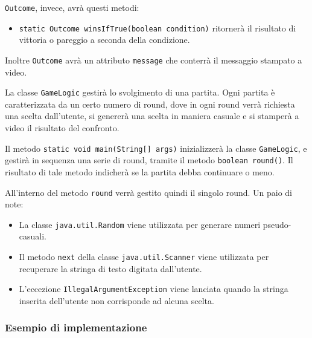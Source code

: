 \documentclass{article}
\begin{document}
\texttt{Outcome}, invece, avrà questi metodi:

\begin{itemize}
	\item \texttt{static Outcome winsIfTrue(boolean condition)} ritornerà il risultato di vittoria o pareggio a seconda della condizione.
\end{itemize}
Inoltre \texttt{Outcome} avrà un attributo \texttt{message} che conterrà il messaggio stampato a video.

La classe \texttt{GameLogic} gestirà lo svolgimento di una partita.
Ogni partita è caratterizzata da un certo numero di round, 
dove in ogni round verrà richiesta una scelta dall'utente, si genererà una scelta in maniera casuale
e si stamperà a video il risultato del confronto.

Il metodo \texttt{static void main(String[] args)} inizializzerà la classe \texttt{GameLogic},
e gestirà in sequenza una serie di round, tramite il metodo \texttt{boolean round()}.
Il risultato di tale metodo indicherà se la partita debba continuare o meno.

All'interno del metodo \texttt{round} verrà gestito quindi il singolo round.
Un paio di note:
\begin{itemize}
	\item La classe \texttt{java.util.Random} viene utilizzata per generare numeri pseudo-casuali.
	\item Il metodo \texttt{next} della classe \texttt{java.util.Scanner} viene utilizzata per recuperare la stringa di testo digitata
	dall'utente.
	\item L'eccezione \texttt{IllegalArgumentException} viene lanciata quando la stringa inserita dell'utente non corrisponde ad alcuna
	scelta.
\end{itemize}

\subsubsection{Esempio di implementazione}
\end{document}
